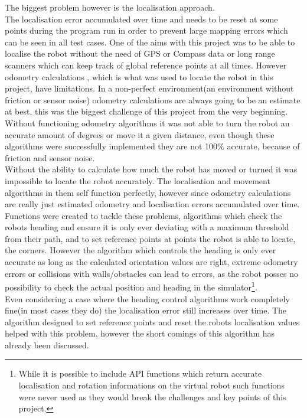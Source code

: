 The biggest problem however is the localisation approach. \\
The localisation error accumulated over time and needs to be reset at some points during the program run in order to prevent large mapping errors which can be seen in all test cases. One of the aims with this project was to be able to localise the robot without the need of GPS or Compass data or long range scanners which can keep track of global reference points at all times. However odometry calculations , which is what was used to locate the robot in this project, have limitations. In a non-perfect environment(an environment without friction or sensor noise) odometry calculations are always going to be an estimate at best, this was the biggest challenge of this project from the very beginning. Without functioning odometry algorithms it was not able to turn the robot an accurate amount of degrees or move it a given distance, even though these algorithms were successfully implemented they are not 100\% accurate, because of friction and sensor noise. \\[3ex]

Without the ability to calculate how much the robot has moved or turned it was impossible to locate the robot accurately.
The localisation and movement algorithms in them self function perfectly, however since odometry calculations are really just estimated odometry and localisation errors accumulated over time. Functions were created to tackle these problems, algorithms which check the robots heading and ensure it is only ever deviating with a maximum threshold from their path, and to set reference points at points the robot is able to locate, the corners. However the algorithm which controls the heading is only ever accurate as long as the calculated orientation values are right, extreme odometry errors or collisions with walls/obstacles can lead to errors, as the robot posses no possibility to check the actual position and heading in the simulator\footnote{While it is possible to include API functions which return accurate localisation and rotation informations on the virtual robot such functions were never used as they would break the challenges and key points of this project.}.\\
Even considering a case where the heading control algorithms work completely fine(in most cases they do) the localisation error still increases over time. The algorithm designed to set reference points and reset the robots localisation values helped with this problem, however the short comings of this algorithm has already been discussed. \\[3ex]

